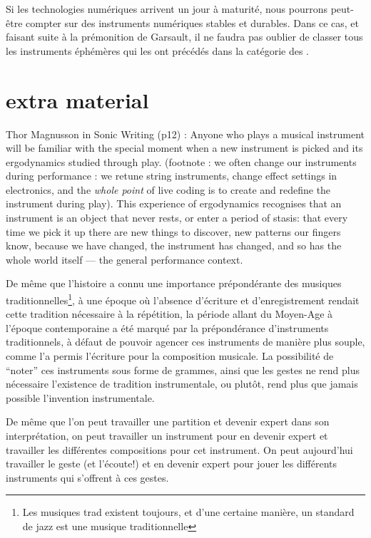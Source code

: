 \indent Si les technologies numériques arrivent un jour à maturité, nous pourrons peut-être compter sur des instruments numériques stables et durables. Dans ce cas, et faisant suite à la prémonition de Garsault, il ne faudra pas oublier de classer tous les instruments éphémères qui les ont précédés dans la catégorie des .


\section{extra material}

Thor Magnusson in Sonic Writing (p12) : Anyone who plays a musical instrument will be familiar with the special moment when a new instrument is picked and its ergodynamics studied through play. (footnote : we often change our instruments during performance : we retune string instruments, change effect settings in electronics, and the \textit{whole point} of live coding is to create and redefine the instrument during play). This experience of ergodynamics recognises that an instrument is an object that never rests, or enter a period of stasis: that every time we pick it up there are new things to discover, new patterns our fingers know, because we have changed, the instrument has changed, and so has the whole world itself — the general performance context.

De même que l'histoire a connu une importance prépondérante des musiques traditionnelles\footnote{Les musiques trad existent toujours, et d'une certaine manière, un standard de jazz est une musique traditionnelle}, à une époque où l'absence d'écriture et d'enregistrement rendait cette tradition nécessaire à la répétition, la période allant du Moyen-Age à l'époque contemporaine a été marqué par la prépondérance d'instruments traditionnels, à défaut de pouvoir agencer ces instruments de manière plus souple, comme l'a permis l'écriture pour la composition musicale. La possibilité de ``noter'' ces instruments sous forme de grammes, ainsi que les gestes ne rend plus nécessaire l'existence de tradition instrumentale, ou plutôt, rend plus que jamais possible l'invention instrumentale.

De même que l'on peut travailler une partition et devenir expert dans son interprétation, on peut travailler un instrument pour en devenir expert et travailler les différentes compositions pour cet instrument. On peut aujourd'hui travailler le geste (et l'écoute!) et en devenir expert pour jouer les différents instruments qui s'offrent à ces gestes.